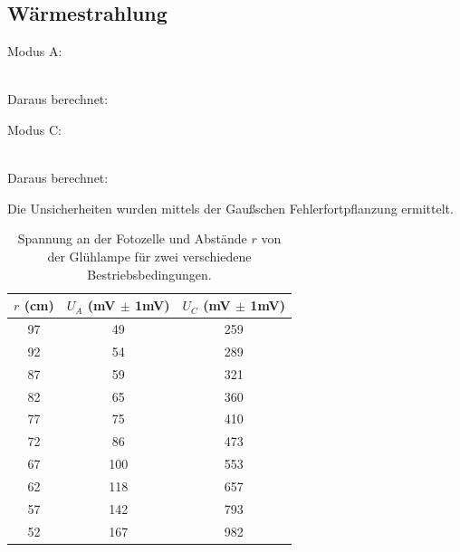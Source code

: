 \documentclass[12pt,a4paper,twopage]{article}
\begin{document}



\subsection{Wärmestrahlung}

Modus A: \begin{center}

 \\

Daraus berechnet:\\
 \end{center}
Modus C: \begin{center}  \\

Daraus berechnet:\\
\end{center}
Die Unsicherheiten wurden mittels der Gaußschen Fehlerfortpflanzung ermittelt.\\
\begin{table}[H]
\begin{center}
\begin{tabular}{|c|c|c|}
\hline
$r$ (cm) & $U_A$ (mV $\pm$ 1mV) & $U_C$ (mV $\pm$ 1mV)\\
\hline
97 & 49 & 259 \\
92 & 54 & 289 \\
87 & 59 & 321 \\
82 & 65 & 360 \\
77 & 75 & 410 \\
72 & 86 & 473 \\
67 & 100 & 553 \\
62 & 118 & 657 \\
57 & 142 & 793 \\
52 & 167 & 982 \\
\hline
\hline
\end{tabular}
\caption{Spannung an der Fotozelle und Abstände $r$ von der Glühlampe für zwei verschiedene Bestriebsbedingungen.}
\end{center}
\end{table}
\end{document}
